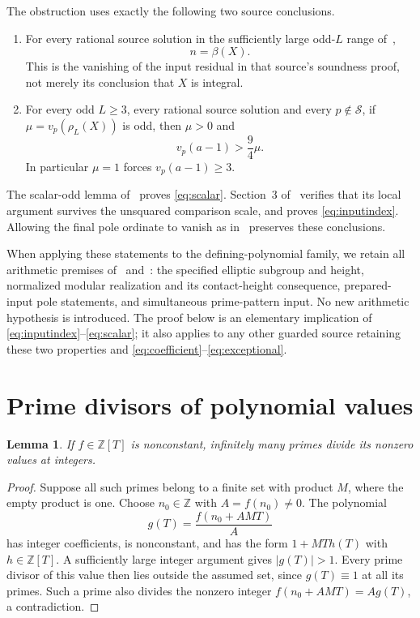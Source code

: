 \documentclass[11pt,a4paper]{article}
\newtheorem{lemma}[theorem]{Lemma}
\newcommand{\Z}{\mathbb Z}
\begin{document}
The obstruction uses exactly the following two source conclusions.
\begin{enumerate}
\item For every rational source solution in the sufficiently large
odd-$L$ range of~\cite[Section~3]{Unit},
\begin{equation}\label{eq:inputindex}
                              n=\beta(X).
\end{equation}
This is the vanishing of the input residual in that source's
soundness proof, not merely its conclusion that $X$ is integral.
\item For every odd $L\ge3$, every rational source solution and every
$p\notin\mathcal S$, if $\mu=v_p(\rho_L(X))$ is odd, then
$\mu>0$ and
\begin{equation}\label{eq:scalar}
                              v_p(a-1)>\frac94\mu.
\end{equation}
In particular $\mu=1$ forces $v_p(a-1)\ge3$.
\end{enumerate}
The scalar-odd lemma of~\cite[Section~3]{General} proves
\eqref{eq:scalar}. Section~3 of~\cite{Unit} verifies that its local
argument survives the unsquared comparison scale, and proves
\eqref{eq:inputindex}. Allowing the final pole ordinate to vanish
as in~\cite{Terminal} preserves these conclusions.

When applying these statements to the defining-polynomial family,
we retain all arithmetic premises of~\cite[Section~1.1]{General}
and~\cite[Section~1]{Unit}: the specified elliptic subgroup and
height, normalized modular realization and its contact-height
consequence, prepared-input pole statements, and simultaneous
prime-pattern input. No new arithmetic hypothesis is introduced.
The proof below is an elementary implication of
\eqref{eq:inputindex}--\eqref{eq:scalar}; it also applies to any
other guarded source retaining these two properties and
\eqref{eq:coefficient}--\eqref{eq:exceptional}.

\section{Prime divisors of polynomial values}

\begin{lemma}\label{lem:schur}
If $f\in\Z[T]$ is nonconstant, infinitely many primes divide its
nonzero values at integers.
\end{lemma}
\begin{proof}
Suppose all such primes belong to a finite set with product $M$,
where the empty product is one. Choose $n_0\in\Z$ with
$A=f(n_0)\ne0$. The polynomial
\[
                    g(T)=\frac{f(n_0+AMT)}{A}
\]
has integer coefficients, is nonconstant, and has the form
$1+MT h(T)$ with $h\in\Z[T]$. A sufficiently large integer
argument gives $|g(T)|>1$. Every prime divisor of this value
then lies outside the assumed set, since $g(T)\equiv1$ at
all its primes. Such a prime also divides the nonzero integer
$f(n_0+AMT)=A g(T)$, a contradiction.
\end{proof}
\end{document}

